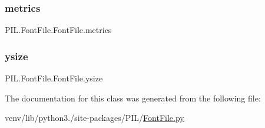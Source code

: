 \subsubsection{\texorpdfstring{metrics}{metrics}}
{\footnotesize\ttfamily P\+I\+L.\+Font\+File.\+Font\+File.\+metrics}

\mbox{\label{classPIL_1_1FontFile_1_1FontFile_ae4d6418337cafd960e9d9d20fa9473e3}} 
\subsubsection{\texorpdfstring{ysize}{ysize}}
{\footnotesize\ttfamily P\+I\+L.\+Font\+File.\+Font\+File.\+ysize}



The documentation for this class was generated from the following file\+:\begin{DoxyCompactItemize}
\item 
venv/lib/python3./site-\/packages/\+P\+I\+L/\hyperlink{FontFile_8py}{Font\+File.\+py}\end{DoxyCompactItemize}
